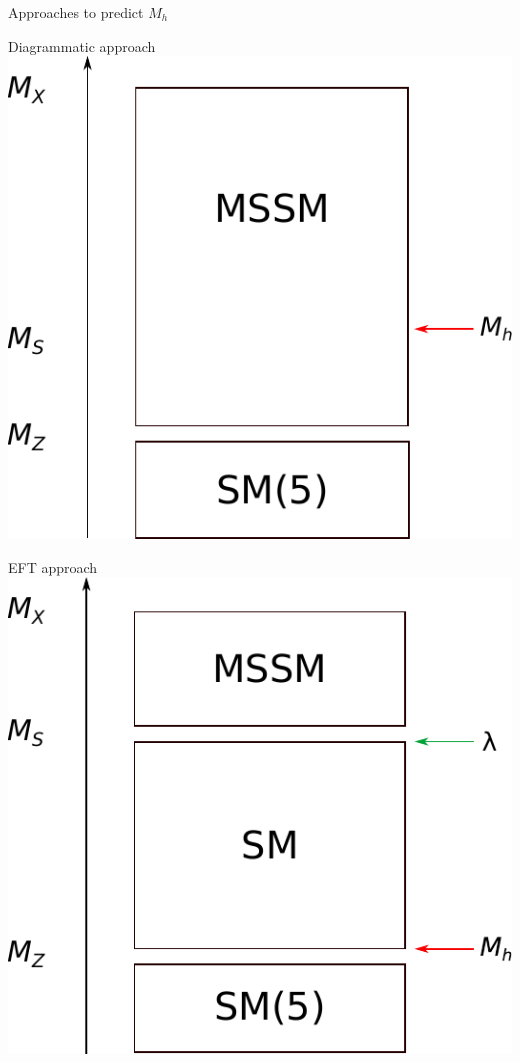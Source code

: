 \documentclass[hyperref={pdfpagelabels=false},ngerman]{beamer}
\begin{document}
\begin{frame}{Approaches to predict $M_h$}
  \begin{minipage}[t]{0.45\textwidth}
    \centering
    Diagrammatic approach\\[1em]
    \includegraphics[width=\textwidth]{images/mssm-sm-tower-diagrammatic}
  \end{minipage}
  \hfill
  \begin{minipage}[t]{0.45\textwidth}
    \centering
    EFT approach\\[1em]
    \includegraphics[width=\textwidth]{images/mssm-sm-tower-eft}
  \end{minipage}
\end{frame}
\end{document}
